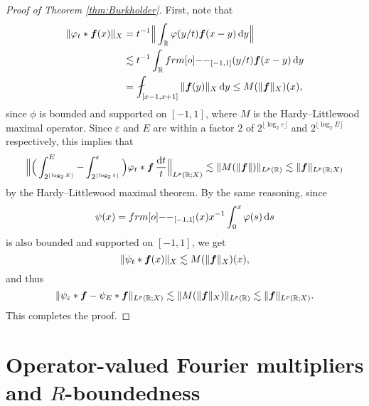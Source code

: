 {\begin{proof}[Proof of Theorem \ref{thm:Burkholder}]
First, note that
\begin{equation*}
  \begin{aligned}
    \|\phi_{t} \ast \mb{f}(x)\|_{X} &= t^{-1} \Big\| \int_{\R} \phi(y/t) \mb{f}(x-y) \, \dd y \Big\| \\
    &\lesssim t^{-1} \int_{\R} \1_{[-1,1]}(y/t) \mb{f}(x-y) \, \dd y \\
    &= \fint_{[x-1, x+1]} \|\mb{f}(y)\|_{X} \, \dd y \leq M(\|\mb{f}\|_{X})(x),
  \end{aligned}
\end{equation*}
since $\phi$ is bounded and supported on $[-1,1]$, where $M$ is the Hardy--Littlewood maximal operator.
Since $\varepsilon$ and $E$ are within a factor $2$ of $2^{\lfloor \log_{2} \varepsilon \rfloor}$ and $2^{\lfloor \log_{2} E \rfloor}$ respectively, this implies that
\begin{equation*}
  \Big\| \Big( \int_{2^{\lfloor \log_{2} E \rfloor}}^{E} - \int_{2^{\lfloor \log_{2} \varepsilon \rfloor}}^{\varepsilon} \Big) \varphi_{t} \ast \bm{f} \, \frac{\mathrm{d} t}{t} \Big\|_{L^p(\mathbb{R};X)}
  \lesssim \|M(\|\bm{f}\|)\|_{L^p(\mathbb{R})} \lesssim \|\bm{f}\|_{L^p(\mathbb{R};X)}
\end{equation*}
by the Hardy--Littlewood maximal theorem.
By the same reasoning, since
\begin{equation*}
  \psi(x) = \1_{[-1,1]}(x) x^{-1} \int_{0}^{x} \phi(s) \, \dd s
\end{equation*}
is also bounded and supported on $[-1,1]$, we get
\begin{equation*}
  \|\psi_{t} \ast \bm{f}(x)\|_{X} \lesssim M(\|\bm{f}\|_{X})(x),
\end{equation*}
and thus
\begin{equation*}
  \|\psi_{\varepsilon} \ast \bm{f} - \psi_{E} \ast \bm{f}\|_{L^p(\mathbb{R};X)} \lesssim \|M(\|\bm{f}\|_{X})\|_{L^p(\mathbb{R})} \lesssim \|\bm{f}\|_{L^p(\mathbb{R};X)}.
\end{equation*}
This completes the proof.
\end{proof}

\section{Operator-valued Fourier multipliers and $R$-boundedness}

}
